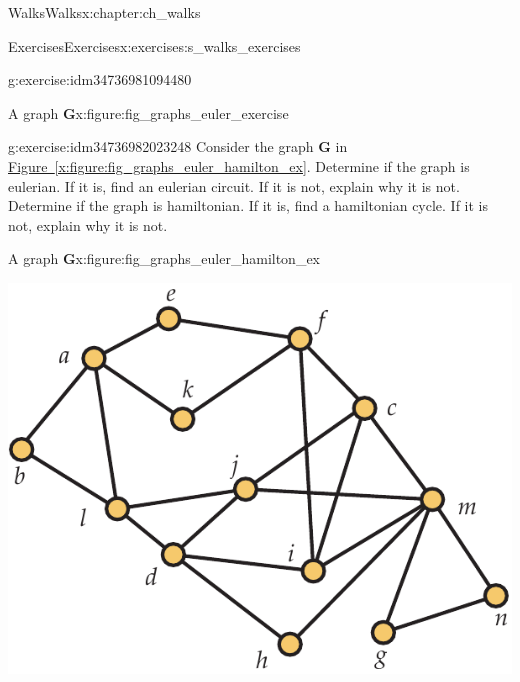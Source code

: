 \documentclass[oneside,10pt,]{book}
\newcommand{\xreffont}{\relax}
\numberwithin{equation}{section}
\newcommand{\bfG}{\mathbf{G}}
\begin{document}
\begin{chapterptx}{Walks}{}{Walks}{}{}{x:chapter:ch_walks}
\begin{exercises-section}{Exercises}{}{Exercises}{}{}{x:exercises:s_walks_exercises}
\begin{divisionexercise}{3}{}{}{g:exercise:idm34736981094480}
\begin{figureptx}{A graph \(\bfG\)}{x:figure:fig_graphs_euler_exercise}{}%
\begin{image}{0.125}{0.75}{0.125}%
%
\end{image}%
\tcblower
\end{figureptx}%
\end{divisionexercise}%
\begin{divisionexercise}{4}{}{}{g:exercise:idm34736982023248}%
Consider the graph \(\bfG\) in \hyperref[x:figure:fig_graphs_euler_hamilton_ex]{Figure~{\xreffont\ref{x:figure:fig_graphs_euler_hamilton_ex}}}. Determine if the graph is eulerian. If it is, find an eulerian circuit. If it is not, explain why it is not. Determine if the graph is hamiltonian. If it is, find a hamiltonian cycle. If it is not, explain why it is not.%
\begin{figureptx}{A graph \(\bfG\)}{x:figure:fig_graphs_euler_hamilton_ex}{}%
\begin{image}{0.175}{0.65}{0.175}%
\includegraphics[width=\linewidth]{images/euler_hamilton_ex}
\end{image}%
\tcblower
\end{figureptx}%
\end{divisionexercise}%
\end{exercises-section}
\end{chapterptx}
\end{document}
